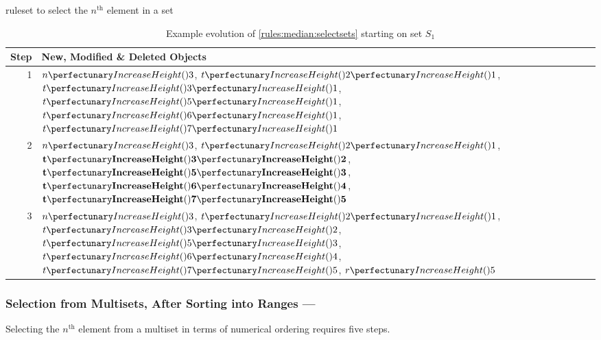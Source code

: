\begin{cprulesetfloat}
\begin{cpruleset}


\end{cpruleset}
\caption{\label{rules:median:selectsets}\Gls{ruleset} to select the \(n^{\text{th}}\) element in a set}
\end{cprulesetfloat}

\begin{table}[htbp]
\centering
   \begin{tabular}{|r|l|}
    \hline
    \textbf{Step} & \textbf{New, Modified \& Deleted Objects} \\ \hline
    1 & \(\cpfunc{n}{3}\), \(\cpfuncn{t}{2}{1}\), \(\cpfuncn{t}{3}{1}\), \(\cpfuncn{t}{5}{1}\), \(\cpfuncn{t}{6}{1}\), \(\cpfuncn{t}{7}{1}\)\\ \hline
    
    2 & \(\cpfunc{n}{3}\), \(\cpfuncn{t}{2}{1}\), \(\mathbf{\cpfuncn{t}{3}{2}}\), \(\mathbf{\cpfuncn{t}{5}{3}}\), \(\mathbf{\cpfuncn{t}{6}{4}}\), \(\mathbf{\cpfuncn{t}{7}{5}}\)\\ \hline
    
    3 & \(\cpfunc{n}{3}\), \(\cpfuncn{t}{2}{1}\), \(\cpfuncn{t}{3}{2}\), \(\cpfuncn{t}{5}{3}\), \(\cpfuncn{t}{6}{4}\), \(\cpfuncn{t}{7}{5}\), \(\cpfunc{r}{5}\)\\ \hline

\end{tabular} 
\caption[Example evolution of \cref{rules:median:selectsets}]{\label{tab:median:selectsets}Example evolution of \cref{rules:median:selectsets} starting on set \(S_1\)}
\end{table}

\subsubsection{Selection from Multisets, After Sorting into Ranges --- }\label{sec:median:selectmultisetrange}

\begin{proposition}\label{prop:median:selectmultisetrange}
Selecting the \(n^{\text{th}}\) element from a multiset in terms of numerical ordering requires five steps.
\end{proposition}


